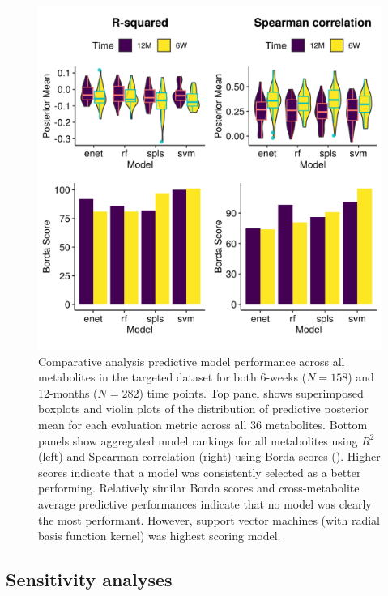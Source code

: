 \begin{figure}[!ht]
    \centering
    \includegraphics[width=\linewidth]{figures/ch2_f5.png}
    \caption[Comparative analysis predictive model performance across all metabolites in the targeted dataset for both 6-weeks ($N = 158$) and 12-months ($N = 282$) time points]{Comparative analysis predictive model performance across all metabolites in the targeted dataset for both 6-weeks ($N = 158$) and 12-months ($N = 282$) time points. Top panel shows superimposed boxplots and violin plots of the distribution of predictive posterior mean for each evaluation metric across all 36 metabolites. Bottom panels show aggregated model rankings for all metabolites using $R^2$ (left) and Spearman correlation (right) using Borda scores (). Higher scores indicate that a model was consistently selected as a better performing. Relatively similar Borda scores and cross-metabolite average predictive performances indicate that no model was clearly the most performant. However, support vector machines (with radial basis function kernel) was highest scoring model.}
    \label{fig:2.5}
\end{figure}

\subsection{Sensitivity analyses}

